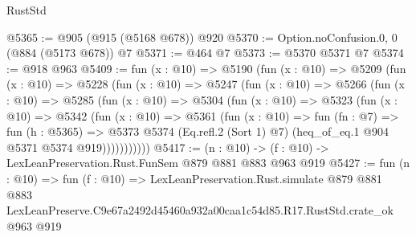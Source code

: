 \begin{lexlean}{RustStd}
\begin{coremodule}
@5365 := @905 (@915 (@5168 @678)) @920
@5370 := Option.noConfusion.{0, 0} (@884 (@5173 @678)) @7
@5371 := @464 @7
@5373 := @5370 @5371 @7
@5374 := @918 @963
@5409 := fun (x : @10) =>
  @5190
    (fun (x : @10) =>
    @5209
      (fun (x : @10) =>
      @5228
        (fun (x : @10) =>
        @5247
          (fun (x : @10) =>
          @5266
            (fun (x : @10) =>
            @5285
              (fun (x : @10) =>
              @5304
                (fun (x : @10) =>
                @5323
                  (fun (x : @10) =>
                  @5342
                    (fun (x : @10) =>
                    @5361
                      (fun (x : @10) =>
                      fun (fn : @7) =>
                      fun (h : @5365) =>
                      @5373
                        @5374
                        (Eq.refl.{2} (Sort 1) @7)
                        (heq_of_eq.{1} @904 @5371 @5374 @919)))))))))))
@5417 := (n : @10) -> (f : @10) -> LexLeanPreservation.Rust.FunSem @879 @881 @883 @963 @919
@5427 := fun (n : @10) =>
  fun (f : @10) =>
  LexLeanPreservation.Rust.simulate
    @879
    @881
    @883
    LexLeanPreserve.C9e67a2492d45460a932a00caa1c54d85.R17.RustStd.crate_ok
    @963
    @919
\end{coremodule}
\end{lexlean}
